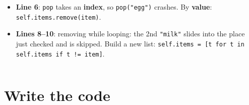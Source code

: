 \documentclass[aspectratio=169]{beamer}
\newcommand{\code}[1]{\texttt{#1}}
\begin{document}
\begin{frame}
\begin{columns}[T,onlytextwidth]
\begin{onlyenv}
\begin{itemize}[itemsep=0.25em, leftmargin=1em]
            Copy it: \code{list(items)}.
      \item \textbf{Line 6}: \code{pop} takes an \textbf{index}, so
            \code{pop("egg")} crashes. By \textbf{value}:
            \code{self.items.remove(item)}.
      \item \textbf{Lines 8--10}: removing while looping: the 2nd \code{"milk"}
            slides into the place just checked and is skipped. Build a new list:
            \code{self.items = [t for t in}\\\code{self.items if t != item]}.
    \end{itemize}
    \end{onlyenv}
  \end{columns}
\end{frame}

\section{Write the code}
\end{document}

